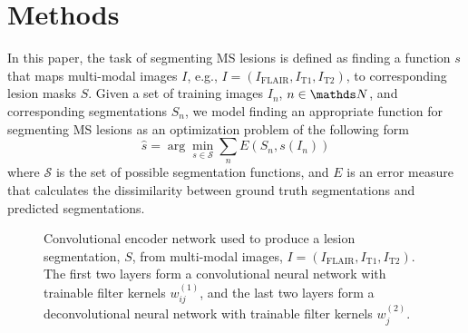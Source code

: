 \section{Methods}
\label{sec:method}

In this paper, the task of segmenting MS lesions is defined as finding a
function $s$ that maps multi-modal images $I$, e.g., $I = (I_\text{FLAIR},
I_\text{T1}, I_\text{T2})$, to corresponding lesion masks $S$. Given a set of
training images $I_n$, $n \in \N$, and corresponding segmentations $S_n$, we
model finding an appropriate function for segmenting MS lesions as an
optimization problem of the following form
\begin{equation}
\hat{s} = \arg \min_{s \in \mathcal{S}} \sum_n E(S_n, s(I_n))
\label{eq:segprob}
\end{equation}
where $\mathcal{S}$ is the set of possible segmentation functions, and $E$ is an
error measure that calculates the dissimilarity between ground truth
segmentations and predicted segmentations.

\begin{figure}[tb]
\centering


\caption{Convolutional encoder network used to produce a lesion segmentation,
$S$, from multi-modal images, $I = (I_\text{FLAIR}, I_\text{T1}, I_\text{T2})$.
The first two layers form a convolutional neural network with trainable filter
kernels $w^{(1)}_{ij}$, and the last two layers form a deconvolutional neural
network with trainable filter kernels $w^{(2)}_j$.}

\label{fig:network}
\end{figure}

